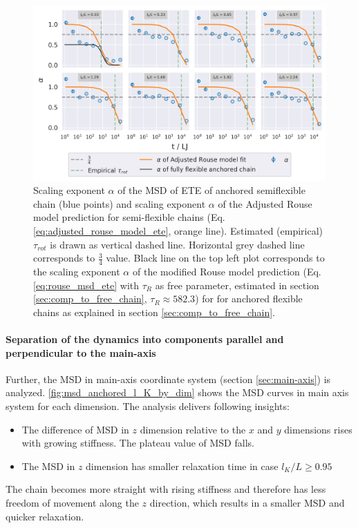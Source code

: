 \documentclass[
    paper=A4,pagesize=automedia,fontsize=12pt,
    BCOR=15mm,DIV=22,
    twoside,headinclude,footinclude=false,
    fleqn,             %
    bibliography=totocnumbered,          %
    listof=totoc,                %
    listof=flat,                 %
    cleardoublepage=empty      %
    numbers=endperiod
]{scrartcl}
\begin{document}
\begin{figure}[h]
    \begin{center}
      \includegraphics[width=\columnwidth,trim={0cm 0cm 0cm 0.0cm},clip]{4-exp-delta_R-rouse_fit-tau-a_alpha.png}
      \caption{\label{fig:alpha_anchored_l_K}
      Scaling exponent $\alpha$ of the MSD of ETE of anchored semiflexible chain (blue points) and 
      scaling exponent $\alpha$ of the Adjusted Rouse model prediction for semi-flexible chains 
      (Eq.\ref{eq:adjusted_rouse_model_ete}, orange line).
      Estimated (empirical) $\tau_{rot}$ is drawn as vertical dashed line.
      Horizontal grey dashed line corresponds to $\frac{3}{4}$ value.
      Black line on the top left plot corresponds to the scaling exponent 
      $\alpha$ of the modified Rouse model prediction 
      (Eq. \ref{eq:rouse_msd_ete}
      with $\tau_R$ as free parameter, estimated in section \ref{sec:comp_to_free_chain},
      $\tau_R \approx 582.3$) for 
      for anchored flexible chains as explained in section \ref{sec:comp_to_free_chain}.
      }
    \end{center}
\end{figure}

\FloatBarrier


\paragraph{Separation of the dynamics into components parallel and perpendicular
to the main-axis}
Further, the MSD in main-axis coordinate system (section \ref{sec:main-axis}) is analyzed.
\autoref{fig:msd_anchored_l_K_by_dim} shows the MSD curves in main axis system
for each dimension. The analysis delivers following insights:
\begin{itemize}
    \item The difference of MSD in $z$ dimension relative to the $x$ and $y$
    dimensions rises with growing stiffness. The plateau value of MSD falls.
    \item The MSD in $z$ dimension has smaller relaxation time in case $l_K/L \ge 0.95$ 
\end{itemize}
The chain becomes more straight with rising stiffness and therefore has less
freedom of movement along the $z$ direction, which results in a smaller MSD and quicker
relaxation.
\end{document}
